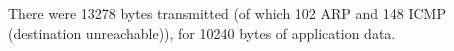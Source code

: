 There were 13278 bytes transmitted (of which 102 ARP and 148 ICMP (destination unreachable)), for 10240 bytes of application data.